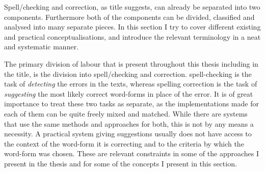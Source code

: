 \documentclass[officiallayout]{unihelcompling}
\begin{document}
Spell\-/checking and correction, as title suggests, can already be
separated into two components. Furthermore both of the components can be
divided, classified and analysed into many separate pieces. In this section I
try to cover different existing and practical conceptualisations, and introduce
the relevant terminology in a neat and systematic manner.

The primary division of labour that is present throughout this thesis including
in the title, is the division into spell\-/checking and correction.
\Gls{spell-checking} is the task of \emph{detecting} the errors in the texts,
whereas \gls{spelling correction} is the task of \emph{suggesting} the most
likely correct \glspl{word-form} in place of the error. It is of great
importance to treat these two tasks as separate, as the implementations made
for each of them can be quite freely mixed and matched.  While there are
systems that use the same methods and approaches for both, this is not by any
means a necessity. A practical system giving suggestions usually does not have
access to the context of the word-form it is correcting and to the criteria by
which the word-form was chosen. These are relevant constraints in some of the
approaches I present in the thesis and for some of the concepts I present in
this section.
\end{document}
